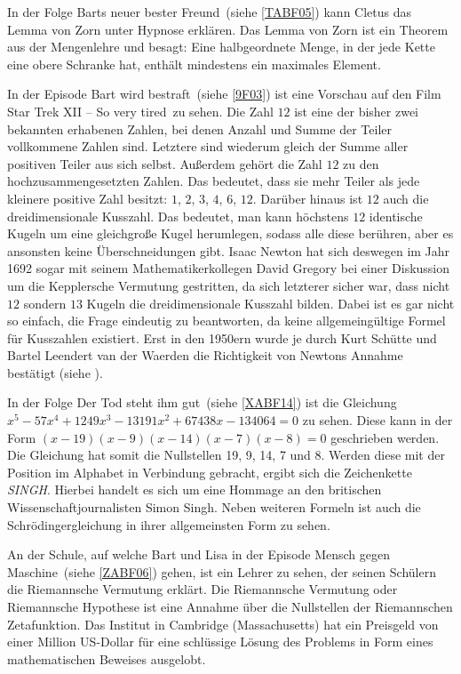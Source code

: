 \begin{appendix}
In der Folge \glqq Barts neuer bester Freund\grqq\ (siehe \ref{TABF05}) kann Cletus das Lemma von Zorn unter Hypnose erklären. Das Lemma von Zorn ist ein Theorem aus der Mengenlehre und besagt: Eine halbgeordnete Menge, in der jede Kette eine obere Schranke hat, enthält mindestens ein maximales Element.

In der Episode \glqq Bart wird bestraft\grqq\ (siehe \ref{9F03}) ist eine Vorschau auf den Film \glqq Star Trek XII -- So very tired\grqq\ zu sehen. Die Zahl $12$ ist eine der bisher zwei bekannten erhabenen Zahlen, bei denen Anzahl und Summe der Teiler vollkommene Zahlen sind. Letztere sind wiederum gleich der Summe aller positiven Teiler aus sich selbst. Außerdem gehört die Zahl $12$ zu den hochzusammengesetzten Zahlen. Das bedeutet, dass sie mehr Teiler als jede kleinere positive Zahl besitzt: $1$, $2$, $3$, $4$, $6$, $12$. Darüber hinaus ist $12$ auch die dreidimensionale Kusszahl. Das bedeutet, man kann höchstens $12$ identische Kugeln um eine gleichgroße Kugel herumlegen, sodass alle diese berühren, aber es ansonsten keine Überschneidungen gibt. Isaac Newton hat sich deswegen im Jahr 1692 sogar mit seinem Mathematikerkollegen David Gregory bei einer Diskussion um die Kepplersche Vermutung gestritten, da sich letzterer sicher war, dass nicht $12$ sondern $13$ Kugeln die dreidimensionale Kusszahl bilden. Dabei ist es gar nicht so einfach, die Frage eindeutig zu beantworten, da keine allgemeingültige Formel für Kusszahlen existiert. Erst in den 1950ern wurde je durch Kurt Schütte und Bartel Leendert van der Waerden die Richtigkeit von Newtons Annahme bestätigt (siehe \cite{Will17}).

In der Folge \glqq Der Tod steht ihm gut\grqq\ (siehe \ref{XABF14}) ist die Gleichung $x^5 - 57x^4 + 1249x^3 - 13191x^2 + 67438x - 134064 = 0$ zu sehen. Diese kann in der Form $(x -19)(x - 9)(x - 14)(x - 7)(x - 8) = 0$ geschrieben werden. Die Gleichung hat somit die Nullstellen 19, 9, 14, 7 und 8. Werden diese mit der Position im Alphabet in Verbindung gebracht, ergibt sich die Zeichenkette \textit{SINGH}. Hierbei handelt es sich um eine Hommage an den britischen Wissenschaftjournalisten Simon Singh. Neben weiteren Formeln ist auch die Schrödingergleichung in ihrer allgemeinsten Form zu sehen.

An der Schule, auf welche Bart und Lisa in der Episode \glqq Mensch gegen Maschine\grqq\ (siehe \ref{ZABF06}) gehen, ist ein Lehrer zu sehen, der seinen Schülern die Riemannsche Vermutung erklärt. Die Riemannsche Vermutung oder Riemannsche Hypothese ist eine Annahme über die Nullstellen der Riemannschen Zetafunktion. Das Institut in Cambridge (Massachusetts) hat ein Preisgeld von einer Million US-Dollar für eine schlüssige Lösung des Problems in Form eines mathematischen Beweises ausgelobt.


\end{appendix}
